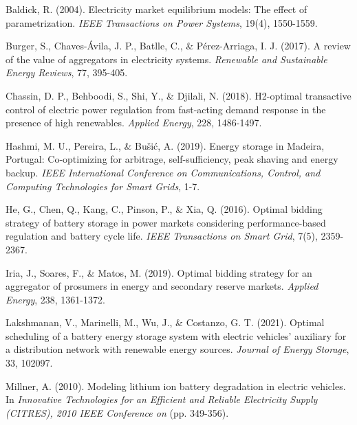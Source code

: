 \documentclass[11pt,a4paper]{article}
\begin{document}

\begin{thebibliography}{45}

Baldick, R. (2004).
\newblock Electricity market equilibrium models: The effect of parametrization.
\newblock \emph{IEEE Transactions on Power Systems}, 19(4), 1550-1559.

Burger, S., Chaves-Ávila, J. P., Batlle, C., \& Pérez-Arriaga, I. J. (2017).
\newblock A review of the value of aggregators in electricity systems.
\newblock \emph{Renewable and Sustainable Energy Reviews}, 77, 395-405.

Chassin, D. P., Behboodi, S., Shi, Y., \& Djilali, N. (2018).
\newblock H2-optimal transactive control of electric power regulation from fast-acting demand response in the presence of high renewables.
\newblock \emph{Applied Energy}, 228, 1486-1497.

Hashmi, M. U., Pereira, L., \& Bušić, A. (2019).
\newblock Energy storage in Madeira, Portugal: Co-optimizing for arbitrage, self-sufficiency, peak shaving and energy backup.
\newblock \emph{IEEE International Conference on Communications, Control, and Computing Technologies for Smart Grids}, 1-7.

He, G., Chen, Q., Kang, C., Pinson, P., \& Xia, Q. (2016).
\newblock Optimal bidding strategy of battery storage in power markets considering performance-based regulation and battery cycle life.
\newblock \emph{IEEE Transactions on Smart Grid}, 7(5), 2359-2367.

Iria, J., Soares, F., \& Matos, M. (2019).
\newblock Optimal bidding strategy for an aggregator of prosumers in energy and secondary reserve markets.
\newblock \emph{Applied Energy}, 238, 1361-1372.

Lakshmanan, V., Marinelli, M., Wu, J., \& Costanzo, G. T. (2021).
\newblock Optimal scheduling of a battery energy storage system with electric vehicles' auxiliary for a distribution network with renewable energy sources.
\newblock \emph{Journal of Energy Storage}, 33, 102097.

Millner, A. (2010).
\newblock Modeling lithium ion battery degradation in electric vehicles.
\newblock In \emph{Innovative Technologies for an Efficient and Reliable Electricity Supply (CITRES), 2010 IEEE Conference on} (pp. 349-356).


\end{thebibliography}
\end{document}
